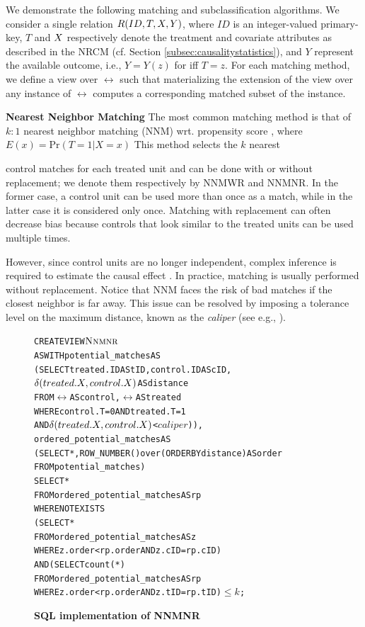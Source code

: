  We demonstrate the following matching and subclassification algorithms.
We consider a single relation ${{R}}(ID,T,{{X}},Y)$,
where $ID$ is an integer-valued primary-key, $T$ and ${{X}}$
respectively denote the treatment and covariate attributes as
described in the NRCM (cf. Section \ref{subsec:causalitystatistics}),
and $Y$ represent the available outcome, i.e., $Y=Y(z)$ for iff $T=z$. For each matching method, we define a view over $\rel$ such that
materializing the extension of the view over any instance of $\rel$
computes a corresponding matched subset of the instance.
 
{\bf Nearest Neighbor Matching}
\label{sec:nnm}
The most common matching method is that of $k:1$ nearest neighbor
matching (NNM) wrt. propensity score \cite{Rubin1983b,ho2005,Stuart10},  where $E(x) = \textrm{Pr}(T = 1 | X=x)$ This method selects
the $k$ nearest  control matches for each treated
unit and can be done with or without replacement; we denote
them respectively by NNMWR and NNMNR.  In the former case, a control
unit can be used more than once as a match, while in the latter case
it is considered only once. Matching with replacement can often
decrease bias because controls that look similar to the treated units
can be used multiple times.   However, since control units
are no longer independent, complex inference is required to estimate
the causal effect \cite{dehejia99}. In practice, matching is usually
performed without replacement.  Notice that NNM faces the risk of bad
matches if the closest neighbor is far away. This issue can be
resolved by imposing a tolerance level on the maximum distance, known
as the {\em caliper} (see e.g., \cite{lunt2014selecting}). 

\begin{figure}
  \centering
\begin{alltt} \scriptsize
CREATE VIEW \(\nnmnr\)
AS WITH potential_matches AS
  (SELECT treated.ID AS tID, control.ID AS cID,
          \(\delta(treated.\cv,control.\cv)\)  AS distance
   FROM \(\rel\) AS control, \(\rel\) AS treated
   WHERE control.T=0 AND treated.T=1
     AND \(\delta(treated.\cv,control.\cv)\) < \(caliper\))),
            ordered_potential_matches AS
  (SELECT *, ROW_NUMBER() over (ORDER BY distance) AS order
   FROM potential_matches)
SELECT *
FROM ordered_potential_matches AS rp
WHERE NOT EXISTS
    (SELECT *
     FROM ordered_potential_matches AS z
     WHERE z.order < rp.order AND z.cID=rp.cID)
  AND (SELECT count(*)
     FROM ordered_potential_matches AS rp
     WHERE z.order < rp.order AND z.tID=rp.tID)\( \leq k\);
\end{alltt} \vspace{-.5cm}
  \caption{\bf SQL implementation of NNMNR}\label{fig:nnmnr}
\end{figure}


